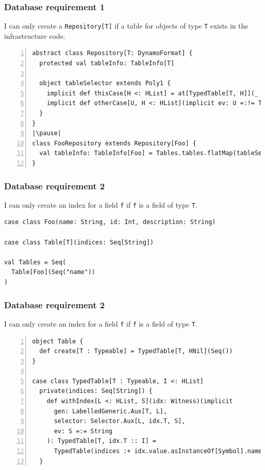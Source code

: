 \documentclass[aspectratio=169]{beamer}
\begin{document}
\begin{frame}[fragile]
\frametitle{Database requirement 1}
I can only create a \texttt{Repository[T]} if a table for objects of type \texttt{T} exists in the infrastructure code.
\hfill \break
\begin{lstlisting}[style=myScalaStyle,frame=none,escapeinside=||,numbers=left]
abstract class Repository[T: DynamoFormat] {
  protected val tableInfo: TableInfo[T]

  object tableSelector extends Poly1 {
    implicit def thisCase[H <: HList] = at[TypedTable[T, H]](_ :: HNil)
    implicit def otherCase[U, H <: HList](implicit ev: U =:!= T) = at[TypedTable[U, H]](_ => HNil)
  }
}
|\pause|
class FooRepository extends Repository[Foo] {
  val tableInfo: TableInfo[Foo] = Tables.tables.flatMap(tableSelector).head.toTableInfo
}

\end{lstlisting}

\end{frame}


\begin{frame}[fragile]
\frametitle{Database requirement 2}
I can only create an index for a field \texttt{f} if \texttt{f} is a field of type \texttt{T}.
\hfill \break
\begin{lstlisting}[style=myScalaStyle,frame=none,escapeinside=||]
case class Foo(name: String, id: Int, description: String)

case class Table[T](indices: Seq[String])

val Tables = Seq(
  Table[Foo](Seq("name"))
)

\end{lstlisting}

\end{frame}

\begin{frame}[fragile]
\frametitle{Database requirement 2}
I can only create an index for a field \texttt{f} if \texttt{f} is a field of type \texttt{T}.
\hfill \break
\begin{lstlisting}[style=myScalaStyle,frame=none,escapeinside=||,numbers=left]
object Table {
  def create[T : Typeable] = TypedTable[T, HNil](Seq())
}

case class TypedTable[T : Typeable, I <: HList] 
  private(indices: Seq[String]) {
    def withIndex[L <: HList, S](idx: Witness)(implicit 
      gen: LabelledGeneric.Aux[T, L], 
      selector: Selector.Aux[L, idx.T, S], 
      ev: S =:= String
    ): TypedTable[T, idx.T :: I] =
      TypedTable(indices :+ idx.value.asInstanceOf[Symbol].name)
  }

\end{lstlisting}

\end{frame}
\end{document}
